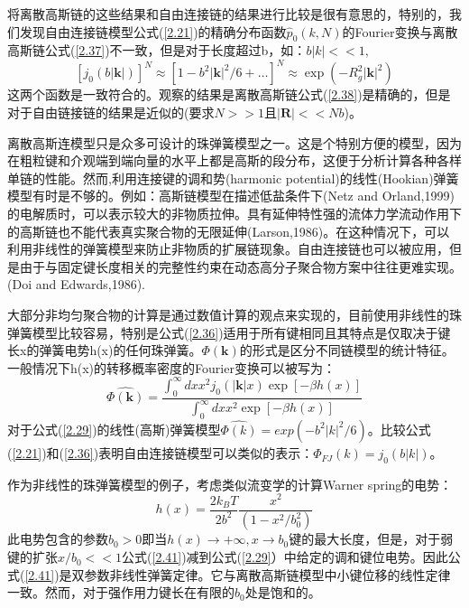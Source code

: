 将离散高斯链的这些结果和自由连接链的结果进行比较是很有意思的，特别的，我们发现自由连接链模型公式(\ref{2.21})的精确分布函数$\hat{p}_{0}(k,N)$的Fourier变换与离散高斯链公式(\ref{2.37})不一致，但是对于长度超过b，如：$b|k|<<1$,
\begin{equation}\label{2.39}
[j_{0}(b|\mathbf{k}|)]^N\approx [1-b^2|\mathbf{k}|^2/6+\dots]^N\approx \exp(-R_{g}^2|\mathbf{k}|^2)
\end{equation}
这两个函数是一致符合的。观察的结果是离散高斯链公式(\ref{2.38})是精确的，但是对于自由链接链的结果是近似的(要求$N>>1$且$|\mathbf{R}|<<Nb$)。

离散高斯连模型只是众多可设计的珠弹簧模型之一。这是个特别方便的模型，因为在粗粒键和介观端到端向量的水平上都是高斯的段分布，这便于分析计算各种各样单链的性能。然而,利用连接键的调和势(harmonic potential)的线性(Hookian)弹簧模型有时是不够的。例如：高斯链模型在描述低盐条件下(Netz and Orland,1999)的电解质时，可以表示较大的非物质拉伸。具有延伸特性强的流体力学流动作用下的高斯链也不能代表真实聚合物的无限延伸(Larson,1986)。在这种情况下，可以利用非线性的弹簧模型来防止非物质的扩展链现象。自由连接链也可以被应用，但是由于与固定键长度相关的完整性约束在动态高分子聚合物方案中往往更难实现。(Doi and Edwards,1986).

大部分非均匀聚合物的计算是通过数值计算的观点来实现的，目前使用非线性的珠弹簧模型比较容易，特别是公式(\ref{2.36})适用于所有键相同且其特点是仅取决于键长x的弹簧电势h(x)的任何珠弹簧。$\varPhi(\mathbf{k})$的形式是区分不同链模型的统计特征。一般情况下h(x)的转移概率密度的Fourier变换可以被写为：
\begin{equation}\label{2.40}
\hat{\varPhi(\mathbf{k})}=\frac{\int_{0}^{\infty} dx x^2j_{0}(|\mathbf{k}|x)\exp[-\beta h(x)]}{\int_{0}^{\infty} dx x^2\exp[-\beta h(x)]} 
\end{equation}
对于公式(\ref{2.29})的线性(高斯)弹簧模型$\hat{\varPhi(k)}=exp(-b^2|k|^2/6)$。比较公式(\ref{2.21})和(\ref{2.36})表明自由连接链模型可以类似的表示：$\hat{\varPhi_{FJ}(k)}=j_{0}(b|k|)$。

作为非线性的珠弹簧模型的例子，考虑类似流变学的计算Warner spring的电势：
\begin{equation}\label{2.41}
h(x)=\frac{2k_{B}T}{2b^2}\frac{x^2}{(1-x^2/b_{0}^2)}
\end{equation}
此电势包含的参数$b_{0}>0$即当$h(x)\to +\infty,x\to b_{0}$键的最大长度，但是，对于弱键的扩张$x/b_{0}<<1$公式(\ref{2.41})减到公式(\ref{2.29}）中给定的调和键位电势。因此公式(\ref{2.41})是双参数非线性弹簧定律。它与离散高斯链模型中小键位移的线性定律一致。然而，对于强作用力键长在有限的$b_{0}$处是饱和的。

